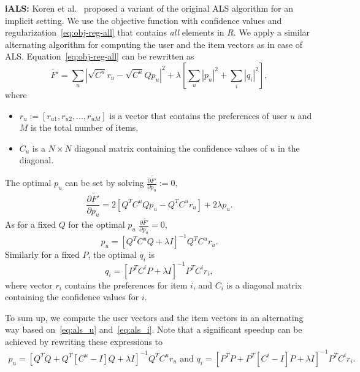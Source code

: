 \documentclass[10pt]{article}
\newenvironment{myitemize}{\begin{itemize} \setlength{\topsep}{0pt} \setlength{\itemsep}{0pt} \setlength{\parskip}{0pt} \setlength{\parsep}{0pt}}{  \end{itemize} }
\begin{document}
\textbf{iALS:}  
Koren et al.~\cite{hu2008collaborative} proposed a variant of the original ALS algorithm for an implicit setting.
We use the objective function with confidence values and regularization~\eqref{eq:obj-reg-all} that contains \emph{all} elements in $R$.
We apply a similar alternating algorithm for computing the user and the item vectors as in case of ALS.
Equation~\eqref{eq:obj-reg-all} can be rewritten as
\begin{equation}
	\tilde{F'} = \displaystyle\sum_u \left | \sqrt{C^u} r_u - \sqrt{C^u} Q p_u \right | ^ 2 + \lambda \left [  \displaystyle\sum_u | p_u | ^ 2 + \displaystyle\sum_i |q_i| ^ 2\right],
\end{equation}
where
\begin{myitemize}
\item $r_u:= \left [ r_{u1}, r_{u2}, ..., r_{uM} \right ]$ is a vector that contains the preferences of user $u$ and $M$ is the total number of items,
\item $C_u$ is a $N \times N$ diagonal matrix containing the confidence values of $u$ in the diagonal.
\end{myitemize}
The optimal $p_u$ can be set by solving $\frac{\partial\tilde{F'}}{\partial p_u}:=0$,
\begin{equation}
	\frac{\partial \tilde{F'} }{\partial p_u} =  2 \left [ Q^T C^u Q p_u  - Q^T C^u r_u \right ]  + 2 \lambda p_u.
\end{equation}
As for a fixed $Q$ for the optimal $p_u$  $\frac{\partial \tilde{F'} }{\partial p_u} = 0$,
\begin{equation}
	p_u =  \left [ Q^T C^u Q + \lambda I \right ] ^ {-1} Q^T C^u r_u.
	\label{eq:als_u}
\end{equation}
Similarly for a fixed $P$, the optimal $q_i$ is
\begin{equation}
	q_i =  \left [ P^T C^i P + \lambda I \right ] ^ {-1} P^T C^i r_i,
	\label{eq:als_i}
\end{equation}
where  vector $r_i$ contains the preferences for item $i$, and $C_i$ is a diagonal matrix containing the confidence values for $i$.

To sum up, we compute the user vectors and the item vectors in an alternating way based on~\eqref{eq:als_u} and~\eqref{eq:als_i}.
Note that a significant speedup can be achieved by rewriting these expressions to 
\begin{gather}
		p_u =  \left [ Q^T Q + Q^T [C^u  - I ] Q + \lambda I \right ] ^ {-1} Q^T C^u r_u\text{ and }
		q_i =  \left [ P^T P + P^T [C^i - I] P + \lambda I \right ] ^ {-1} P^T C^i r_i.
\end{gather}
\end{document}
